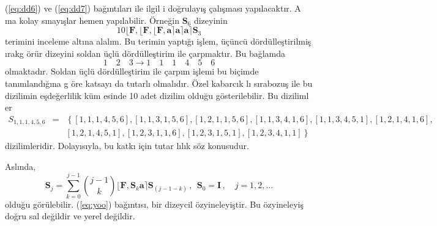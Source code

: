 \documentclass[a4paper,10pt]{article}
\begin{document}
(\ref{eq:dd6}) ve (\ref{eq:dd7}) ba\u{g}\i nt\i lar{\i} ile ilgil%
i do\u{g}rulay\i \c{s} \c{c}al\i \c{s}mas{\i} yap\i lacakt\i r. A%
ma kolay s\i nay\i \c{s}lar hemen yap\i labilir. \"Or\-ne\u{g}in %
$\mathbf{S}_{6}$ dizeyinin %
\begin{equation}
10  \lfloor \mathbf{F} ,  \lfloor \mathbf{F} , \lfloor \mathbf{F} 
 , \mathbf{a} \rceil \mathbf{a} \rceil \mathbf{a} \rceil 
 \mathbf{S}_{3}                                                                     
\end{equation}
terimini inceleme alt\i na alal\i m. Bu terimin yapt\i \u{g}{\i} %
i\c{s}lem, \"u\c{c}\"unc\"u d\"ord\"ulle\c{s}tirilmi\c{s} \i rakg%
\"or\"ur dizeyini soldan \"u\c{c}l\"u d\"ord\"ulle\c{s}tirim ile %
\c{c}arpmakt\i r. Bu ba\u{g}lamda %
\begin{equation}
  1\quad 2\quad 3 \rightarrow 1\quad 1\quad 1\quad 4\quad 5\quad 6
\end{equation}
olmaktad\i r. Soldan \"u\c{c}l\"u d\"ord\"ulle\c{s}\-ti\-rim ile %
\c{c}arp\i m i\c{s}lemi bu bi\c{c}imde tan\i mland\i \u{g}\i na g%
\"ore katsay{\i} da tutarl{\i} olmal\i d\i r. \"O\-zel kabarc\i k%
l{\i} s\i rabozu\c{s} ile bu dizilimin e\c{s}de\u{g}erlilik k\"um%
esinde 10 adet dizilim oldu\u{g}u g\"osterilebilir. Bu di\-ziliml%
er %
\begin{eqnarray}
 S_{1,1,1,4,5,6} &=& \left\{[1,1,1,4,5,6],[1,1,3,1,5,6],%
[1,2,1,1,5,6],[1,1,3,4,1,6],[1,1,3,4,5,1],%
[1,2,1,4,1,6],\right.\nonumber\\
 &&\left.[1,2,1,4,5,1],[1,2,3,1,1,6],%
[1,2,3,1,5,1],[1,2,3,4,1,1]\right\}
\end{eqnarray}
dizilimleridir. Dolay\i s\i yla, bu kat\-k{\i} i\-\c{c}in tu\-tar%
l{\i}l\i k s\"oz konusudur. %

Asl\i nda,  
\begin{equation}
 \mathbf{S}_{j} = \sum_{k=0}^{j-1} 
 {j-1 \choose k}  \lfloor \mathbf{F} , 
 \mathbf{S}_{k}\mathbf{a} \rceil
 \mathbf{S}_{(j-1-k)} \, ,  \,\;  \mathbf{S}_{0} = \mathbf{I}\, , 
\quad j=1,2,\ldots
\label{eq:yoo}
\end{equation}
oldu\u{g}u g\"or\"ulebilir. (\ref{eq:yoo}) ba\u{g}\i nt\i s{\i}, %
bir dizeycil \"ozyineleyi\c{s}tir. Bu \"ozyineleyi\c{s} do\u{g}ru%
sal de\u{g}ildir ve yerel de\u{g}ildir. %
\end{document}
